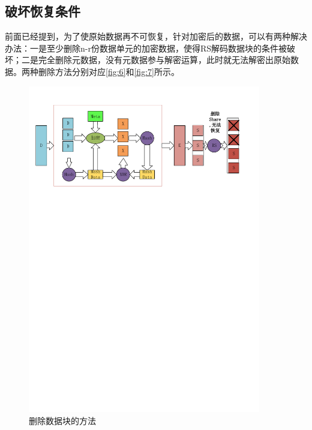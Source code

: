 \subsection{破坏恢复条件}
前面已经提到，为了使原始数据再不可恢复，针对加密后的数据，可以有两种解决办法：一是至少删除n-r份数据单元的加密数据，使得RS解码数据块的条件被破坏；二是完全删除元数据，没有元数据参与解密运算，此时就无法解密出原始数据。两种删除方法分别对应\autoref{fig:6}和\autoref{fig:7}所示。
\begin{figure}[H]
	\centering
	\includegraphics[width=4in]{Pics/del-share.pdf}
	\caption{删除数据块的方法}\label{fig:6}
\end{figure}
